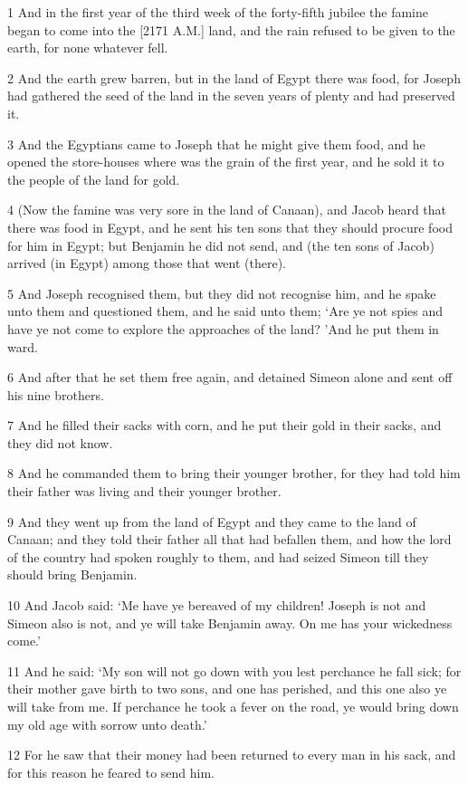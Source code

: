 \par 1 And in the first year of the third week of the forty-fifth jubilee the famine began to come into the [2171 A.M.] land, and the rain refused to be given to the earth, for none whatever fell.
\par 2 And the earth grew barren, but in the land of Egypt there was food, for Joseph had gathered the seed of the land in the seven years of plenty and had preserved it.
\par 3 And the Egyptians came to Joseph that he might give them food, and he opened the store-houses where was the grain of the first year, and he sold it to the people of the land for gold.
\par 4 (Now the famine was very sore in the land of Canaan), and Jacob heard that there was food in Egypt, and he sent his ten sons that they should procure food for him in Egypt; but Benjamin he did not send, and (the ten sons of Jacob) arrived (in Egypt) among those that went (there).
\par 5 And Joseph recognised them, but they did not recognise him, and he spake unto them and questioned them, and he said unto them; ‘Are ye not spies and have ye not come to explore the approaches of the land? ’And he put them in ward.
\par 6 And after that he set them free again, and detained Simeon alone and sent off his nine brothers.
\par 7 And he filled their sacks with corn, and he put their gold in their sacks, and they did not know.
\par 8 And he commanded them to bring their younger brother, for they had told him their father was living and their younger brother.
\par 9 And they went up from the land of Egypt and they came to the land of Canaan; and they told their father all that had befallen them, and how the lord of the country had spoken roughly to them, and had seized Simeon till they should bring Benjamin.
\par 10 And Jacob said: ‘Me have ye bereaved of my children! Joseph is not and Simeon also is not, and ye will take Benjamin away. On me has your wickedness come.’
\par 11 And he said: ‘My son will not go down with you lest perchance he fall sick; for their mother gave birth to two sons, and one has perished, and this one also ye will take from me. If perchance he took a fever on the road, ye would bring down my old age with sorrow unto death.’
\par 12 For he saw that their money had been returned to every man in his sack, and for this reason he feared to send him.
